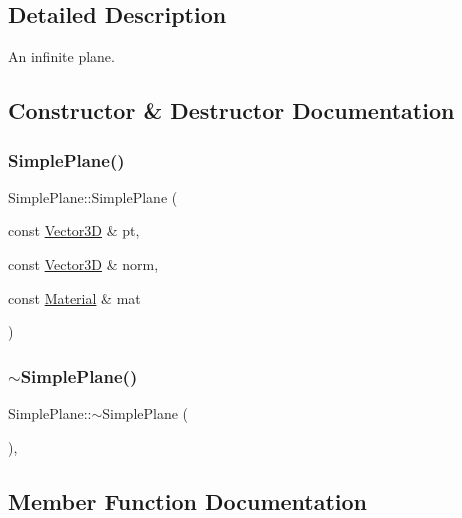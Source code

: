 \subsection{Detailed Description}
An infinite plane. 

\subsection{Constructor \& Destructor Documentation}
\mbox{\label{classSimplePlane_a4536573a977f9d4c30334f9c4aab6a1d}} 
\subsubsection{\texorpdfstring{SimplePlane()}{SimplePlane()}}
{\footnotesize\ttfamily Simple\+Plane\+::\+Simple\+Plane (\begin{DoxyParamCaption}\item[{const \mbox{\hyperlink{classVector3D}{Vector3D}} \&}]{pt,  }\item[{const \mbox{\hyperlink{classVector3D}{Vector3D}} \&}]{norm,  }\item[{const \mbox{\hyperlink{classMaterial}{Material}} \&}]{mat }\end{DoxyParamCaption})}

\mbox{\label{classSimplePlane_abc63c5079688f3d1826a7f2ed5f9db3f}} 
\subsubsection{\texorpdfstring{$\sim$SimplePlane()}{~SimplePlane()}}
{\footnotesize\ttfamily Simple\+Plane\+::$\sim$\+Simple\+Plane (\begin{DoxyParamCaption}{ }\end{DoxyParamCaption})\hspace{0.3cm}{\ttfamily [override]}, {\ttfamily [default]}}



\subsection{Member Function Documentation}
\mbox{\label{classSimplePlane_a29180f657d6932226dc91ebe92143608}} 
